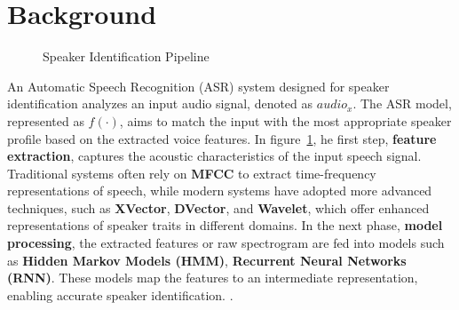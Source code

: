 \documentclass[conference]{IEEEtran}
\begin{document}
\section{Background}





\begin{figure}[H]
    \centering
    \label{fig:speaker_identification_pipeline}
    \caption{Speaker Identification Pipeline}
\end{figure}


An Automatic Speech Recognition (ASR) system designed for speaker identification analyzes an input audio signal, denoted as $audio_x$.
The ASR model, represented as $f(\cdot)$, aims to match the input with the most appropriate speaker profile based on the extracted voice features.
In figure~\ref{fig:speaker_identification_pipeline}, he first step, \textbf{feature extraction},
captures the acoustic characteristics of the input speech signal. Traditional systems often rely on \textbf{MFCC} to extract time-frequency representations of speech,
while modern systems have adopted more advanced techniques, such as \textbf{XVector}, \textbf{DVector}, and \textbf{Wavelet}, which offer enhanced representations of
speaker traits in different domains. In the next phase, \textbf{model processing}, the extracted features or raw spectrogram are fed into models such as \textbf{Hidden Markov Models (HMM)},
\textbf{Recurrent Neural Networks (RNN)}. These models map the features to an intermediate representation,
enabling accurate speaker identification. \cite{davis1980comparison, Snyder2018Xvectors,wan2018dvector,graves2013speech}.
\end{document}
